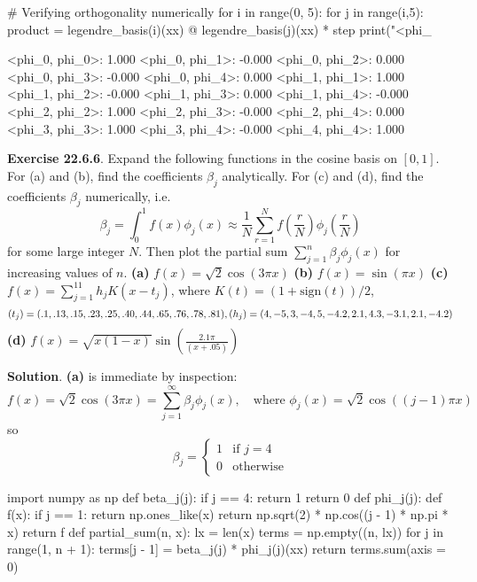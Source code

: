 \begin{python}
# Verifying orthogonality numerically
for i in range(0, 5):
    for j in range(i,5):
        product = legendre_basis(i)(xx) @ legendre_basis(j)(xx) * step
        print("<phi_%
\end{python}
\begin{console}
<phi\_{0}, phi\_{0}>: 1.000
<phi\_{0}, phi\_{1}>: -0.000
<phi\_{0}, phi\_{2}>: 0.000
<phi\_{0}, phi\_{3}>: -0.000
<phi\_{0}, phi\_{4}>: 0.000
<phi\_{1}, phi\_{1}>: 1.000
<phi\_{1}, phi\_{2}>: -0.000
<phi\_{1}, phi\_{3}>: 0.000
<phi\_{1}, phi\_{4}>: -0.000
<phi\_{2}, phi\_{2}>: 1.000
<phi\_{2}, phi\_{3}>: -0.000
<phi\_{2}, phi\_{4}>: 0.000
<phi\_{3}, phi\_{3}>: 1.000
<phi\_{3}, phi\_{4}>: -0.000
<phi\_{4}, phi\_{4}>: 1.000
\end{console}

\textbf{Exercise 22.6.6}. Expand the following functions in the cosine
basis on \([0, 1]\). For (a) and (b), find the coefficients \(\beta_{j}\)
analytically. For (c) and (d), find the coefficients \(\beta_{j}\)
numerically, i.e.
\[
\beta_{j} = \int_{0}^{1} f(x) \phi_{j}(x) \approx \frac{1}{N} \sum_{r=1}^N f \left( \frac{r}{N} \right) \phi_{j} \left( \frac{r}{N} \right)
\]
for some large integer \(N\). Then plot the partial sum
\(\sum_{j=1}^{n} \beta_{j} \phi_{j}(x)\) for increasing values of \(n\).
\textbf{(a)} \(f(x) = \sqrt{2} \cos (3 \pi x)\)
\textbf{(b)} \(f(x) = \sin(\pi x)\)
\textbf{(c)} \(f(x) = \sum_{j=1}^{11} h_{j} K(x - t_{j})\), where
\(K(t) = (1 + \text{sign}(t)) / 2\),
\[
(t_{j}) = (.1, .13, .15, .23, .25, .40, .44, .65, .76, .78, .81), \\
(h_{j}) = (4, -5, 3, -4, 5, -4.2, 2.1, 4.3, -3.1, 2.1, -4.2)
\]
\textbf{(d)} $f(x) = \sqrt{x(1-x)} \sin \left(
\frac{2.1 \pi}{(x + .05)} \right) $

\textbf{Solution}.
\textbf{(a)} is immediate by inspection:
\[
f(x) = \sqrt{2} \cos(3 \pi x) = \sum_{j=1}^{\infty} \beta_{j} \phi_{j}(x), \quad \text{where } \phi_{j}(x) = \sqrt{2} \cos((j - 1) \pi x)
\]
so
\[
\beta_{j} = \begin{cases}
1 & \text{if } j = 4 \\
0 & \text{otherwise}
\end{cases}
\]

\begin{python}
import numpy as np
def beta_{j}(j):
    if j == 4:
        return 1
    return 0
def phi_{j}(j):
    def f(x):
        if j == 1:
            return np.ones_like(x)
        return np.sqrt(2) * np.cos((j - 1) * np.pi * x)
    return f
def partial_sum(n, x):
    lx = len(x)
    terms = np.empty((n, lx))
    for j in range(1, n + 1):
        terms[j - 1] = beta_{j}(j) * phi_{j}(j)(xx)
    return terms.sum(axis = 0)
\end{python}

